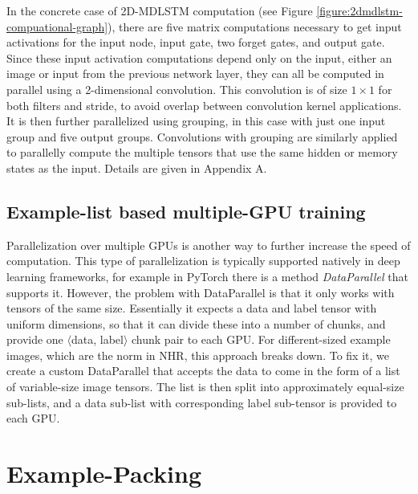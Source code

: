 \documentclass[conference]{IEEEtran}
\renewcommand{\ac}[1]{\gls{#1}}
\begin{document}
In the concrete case of 2D-\ac{MDLSTM} computation (see Figure \ref{figure:2dmdlstm-compuational-graph}), there are five matrix computations necessary to get input activations for the 
input node, input gate, two forget gates, and output gate. 
Since these input activation computations depend only on
the input, either an image or input from the previous network layer, they can all be computed in parallel using a 2-dimensional
convolution. This convolution is of size $1 \times 1$ for both filters and stride, to avoid overlap between convolution kernel applications.
It is then further parallelized using grouping, in this case with just one input group and five output groups.
Convolutions with grouping are similarly applied to parallelly compute the multiple tensors 
that use the same hidden or memory states as the input. Details are given in Appendix A.


\subsection{Example-list based multiple-GPU training}
Parallelization over multiple GPUs is another way to further increase the speed of computation.
This type of parallelization is typically supported natively in deep learning frameworks, for example 
in PyTorch there is a method \emph{DataParallel} that supports it. However, the problem with DataParallel 
is that it only works with tensors of the same size. Essentially it expects a data and label tensor 
with uniform dimensions, so that it can divide these into a number of chunks, and provide one $\langle$data, label$\rangle$
chunk pair to each GPU. For different-sized example images, which are the norm in \ac{NHR}, this 
approach breaks down. To fix it, we create a custom DataParallel that accepts the data to come in the form of a list of 
variable-size image tensors. The list is then split into approximately equal-size sub-lists, and a data sub-list with 
corresponding label sub-tensor is provided to each GPU. 
 

\section{Example-Packing}
\label{section:example-packing}
\end{document}
